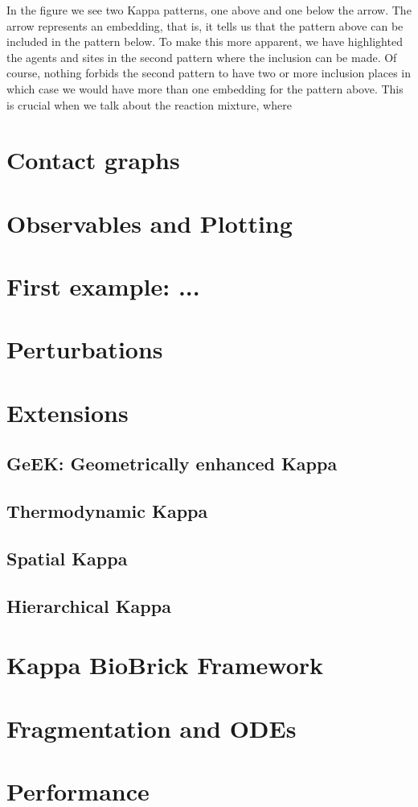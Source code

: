 \documentclass{article}
\newcommand{\kpp}{Kappa\xspace}
\begin{document}
In the figure we see two \kpp patterns, one above and one below the
arrow.  The arrow represents an embedding, that is, it tells us that
the pattern above can be included in the pattern below.  To make this
more apparent, we have highlighted the agents and sites in the second
pattern where the inclusion can be made.  Of course, nothing forbids
the second pattern to have two or more inclusion places in which case
we would have more than one embedding for the pattern above.  This is
crucial when we talk about the reaction mixture, where

\section{Contact graphs}

\section{Observables and Plotting}

\section{First example: ...}

\section{Perturbations} %

\section{Extensions}
\subsection{GeEK: Geometrically enhanced Kappa}

\subsection{Thermodynamic Kappa}

\subsection{Spatial Kappa}

\subsection{Hierarchical Kappa} %

\section{Kappa BioBrick Framework}

\section{Fragmentation and ODEs}

\section{Performance} %
\end{document}
